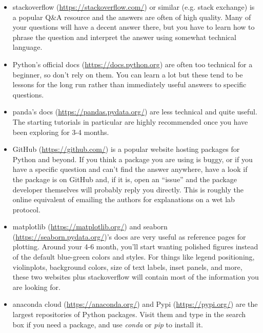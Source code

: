 \documentclass[12pt,a4paper,notitlepage,onecolumn]{article}
\begin{document}
\begin{itemize}
\item stackoverflow (\url{https://stackoverflow.com/}) or similar (e.g. stack exchange) is a popular Q\&A resource and the answers are often of high quality. Many of your questions will have a decent answer there, but you have to learn how to phrase the question and interpret the answer using somewhat technical language.
\item Python's official docs (\url{https://docs.python.org}) are often too technical for a beginner, so don't rely on them. You can learn a lot but these tend to be lessons for the long run rather than immediately useful answers to specific questions.
\item panda's docs (\url{https://pandas.pydata.org/}) are less technical and quite useful. The starting tutorials in particular are highly recommended once you have been exploring for 3-4 months.
\item GitHub (\url{https://github.com/}) is a popular website hosting packages for Python and beyond. If you think a package you are using is buggy, or if you have a specific question and can't find the answer anywhere, have a look if the package is on GitHub and, if it is, open an ``issue'' and the package developer themselves will probably reply you directly. This is roughly the online equivalent of emailing the authors for explanations on a wet lab protocol.
\item matplotlib (\url{https://matplotlib.org/}) and seaborn (\url{https://seaborn.pydata.org/})'s docs are very useful as reference pages for plotting. Around your 4-6 month, you'll start wanting polished figures instead of the default blue-green colors and styles. For things like legend positioning, violinplots, background colors, size of text labels, inset panels, and more, these two websites plus stackoverflow will contain most of the information you are looking for.
\item anaconda cloud (\url{https://anaconda.org/}) and Pypi (\url{https://pypi.org/}) are the largest repositories of Python packages. Visit them and type in the search box if you need a package, and use \textit{conda} or \textit{pip} to install it.
\end{itemize}
\end{document}

